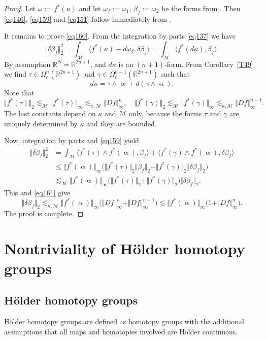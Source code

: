 \documentclass[intlimits,12pt,reqno]{amsart}
\newcommand{\cM}{\mathcal M}
\newcommand{\R}{\mathbb R}
\numberwithin{equation}{section}
\theoremstyle{definition}
\begin{document}
\begin{proof}
Let $\omega:=f^*(\kappa)$ and let $\omega_f:=\omega_1$, $\beta_f:=\omega_2$ be the forms from . Then \eqref{eq146}, \eqref{eq159} and \eqref{eq151} follow immediately from .

It remains to prove \eqref{eq160}. From the integration by parts \eqref{eq137} we have
$$
\Vert\delta\beta_f\Vert_2^2=\int_\cM\langle f^*(\kappa)-d\omega_f,\delta\beta_f\rangle=
\int_\cM\langle f^*(d\kappa),\beta_f\rangle.
$$
By assumption $\R^N = \R^{2n+1}$, and $d\kappa$ is an $(n+1)$-form. From Corollary~\ref{T49} we find 
$\tau \in \Omega_c^n(\R^{2n+1})$ and $\gamma \in\Omega_c^{n-1}(\R^{2n+1})$ such that 
\[
d\kappa = \tau \wedge \upalpha + d(\gamma \wedge \upalpha).
\]
Note that
\begin{equation}
\label{eq161}
\Vert f^*(\tau)\Vert_2\lesssim_\cM\Vert f^*(\tau)\Vert_\infty\lesssim_{\kappa,\cM}\Vert Df\Vert_\infty^n,
\quad
\Vert f^*(\gamma)\Vert_2\lesssim_\cM\Vert f^*(\gamma)\Vert_\infty\lesssim_{\kappa,\cM}\Vert Df\Vert_\infty^{n-1}.
\end{equation}
The last constants depend on $\kappa$ and $\cM$ only, because the forms $\tau$ and $\gamma$ are uniquely determined by $\kappa$ and they are bounded.

Now, integration by parts and \eqref{eq159} yield
\[
\begin{split}
\Vert\delta\beta_f\Vert_2^2
&=
\int_\cM \langle f^*(\tau)\wedge f^*(\upalpha),\beta_f\rangle+
\langle f^*(\gamma)\wedge f^*(\upalpha),\delta\beta_f\rangle\\
&\leq\Vert f^*(\upalpha)\Vert_\infty\big(\Vert f^*(\tau)\Vert_2\Vert\beta_f\Vert_2+\Vert f^*(\gamma)\Vert_2\Vert\delta\beta_f\Vert_2\big)\\
&\lesssim_\cM 
\Vert f^*(\upalpha)\Vert_\infty\big(\Vert f^*(\tau)\Vert_2+\Vert f^*(\gamma)\Vert_2\big)\Vert\delta\beta_f\Vert_2.
\end{split}
\]
This and \eqref{eq161} give 
$$
\Vert\delta\beta_f\Vert_2\lesssim_{\kappa,\cM}\Vert f^*(\upalpha)\Vert_\infty
\big(\Vert Df\Vert_\infty^n+\Vert Df\Vert_\infty^{n-1}\big)
\lesssim
\Vert f^*(\upalpha)\Vert_\infty
\big(1+\Vert Df\Vert_\infty^n\big).
$$
The proof is complete. 
\end{proof}
\section{Nontriviality of H\"older homotopy groups}
\label{NHG}

\subsection{H\"older homotopy groups}
H\"older homotopy groups are defined as homotopy groups with the additional assumptions that all maps and homotopies involved are H\"older continuous. 
\end{document}
